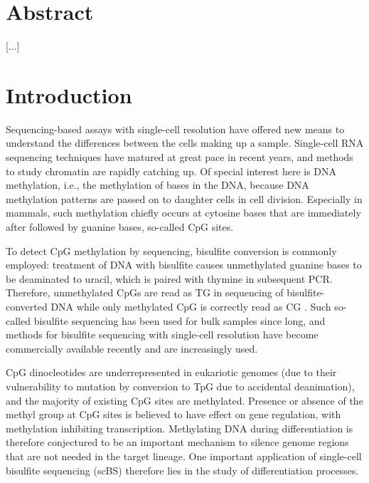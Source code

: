 \documentclass[twocolumn,10pt]{article}
\begin{document}
\setcounter{secnumdepth}{0}


\section{Abstract}

[...]

\section{Introduction}

Sequencing-based assays with single-cell resolution have offered new means to understand the differences between the cells making up a sample. Single-cell RNA sequencing techniques have matured at great pace in recent years, and methods to study chromatin are rapidly catching up. Of special interest here is DNA methylation, i.e., the methylation of bases in the DNA, because DNA methylation patterns are passed on to daughter cells in cell division. Especially in mammals, such methylation chiefly occurs at cytosine bases that are immediately after followed by guanine bases, so-called CpG sites. 

To detect CpG methylation by sequencing, bisulfite conversion is commonly employed: treatment of DNA with bisulfite causes unmethylated guanine bases to be deaminated to uracil, which is paired with thymine in subsequent PCR. Therefore, unmethylated CpGs are read as TG in sequencing of bisulfite-converted DNA while only methylated CpG is correctly read as CG \citep{Frommer_1992}. Such so-called bisulfite sequencing has been used for bulk samples since long, and methods for bisulfite sequencing with single-cell resolution \citep{Smallwood_2014} have become commercially available recently and are increasingly used.

CpG dinocleotides are underrepresented in eukariotic genomes (due to their vulnerability to mutation by conversion to TpG due to accidental deanimation), and the majority of existing CpG sites are methylated. Presence or absence of the methyl group at CpG sites is believed to have effect on gene regulation, with methylation inhibiting transcription. Methylating DNA during differentiation is therefore conjectured to be an important mechanism to silence genome regions that are not needed in the target lineage. One important application of single-cell bisulfite sequencing (scBS) therefore lies in the study of differentiation processes.
\end{document}
